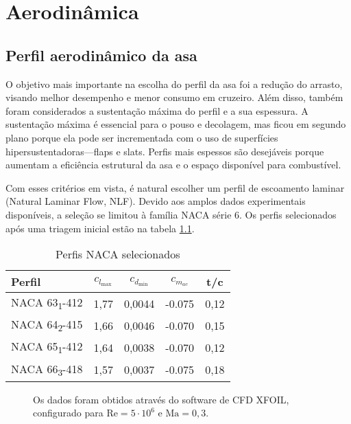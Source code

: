 \chapter{Aerodinâmica}
\section{Perfil aerodinâmico da asa}

O objetivo mais importante na escolha do perfil da asa foi a redução do arrasto, visando melhor desempenho e menor consumo em cruzeiro. Além disso, também foram considerados a sustentação máxima do perfil e a sua espessura. A sustentação máxima é essencial para o pouso e decolagem, mas ficou em segundo plano porque ela pode ser incrementada com o uso de superfícies hipersustentadoras---flaps e slats. Perfis mais espessos são desejáveis porque aumentam a eficiência estrutural da asa e o espaço disponível para combustível.

Com esses critérios em vista, é natural escolher um perfil de escoamento laminar (Natural Laminar Flow, NLF). Devido aos amplos dados experimentais disponíveis, a seleção se limitou à família NACA série 6. Os perfis selecionados após uma triagem inicial estão na tabela \ref{tbl:perfisNACASelecionados}.

\begin{table}[h]
  \label{tbl:perfisNACASelecionados}
  \caption{Perfis NACA selecionados}
  \centering
  \begin{tabular}{lcccc}
    \toprule
    Perfil &
    $ c_{l_{\max}} $ & $ c_{d_{\min}} $ & $ c_{m_{ac}} $ & t/c \\
    \midrule
    NACA 63\textsubscript{1}-412 & 1,77 &0,0044 & -0.075 & 0,12 \\
    NACA 64\textsubscript{2}-415 & 1,66 &0,0046 & -0.070 & 0,15 \\
    NACA 65\textsubscript{1}-412 & 1,64 &0,0038 & -0.070 & 0,12 \\
    NACA 66\textsubscript{3}-418 & 1,57 &0,0037 & -0.075 & 0,18 \\
    \bottomrule
  \end{tabular}
\end{table}

\begin{figure}[p]
    
    \caption[Coeficientes Aerodinâmicos dos Perfis Selecionados]{Os dados foram
    obtidos através do software de CFD XFOIL\cite{xfoil}, configurado
    para $\text{Re} = 5\cdot10^6$ e $\text{Ma} =0,3$.}
    \label{fig:aero_coef}
\end{figure}

